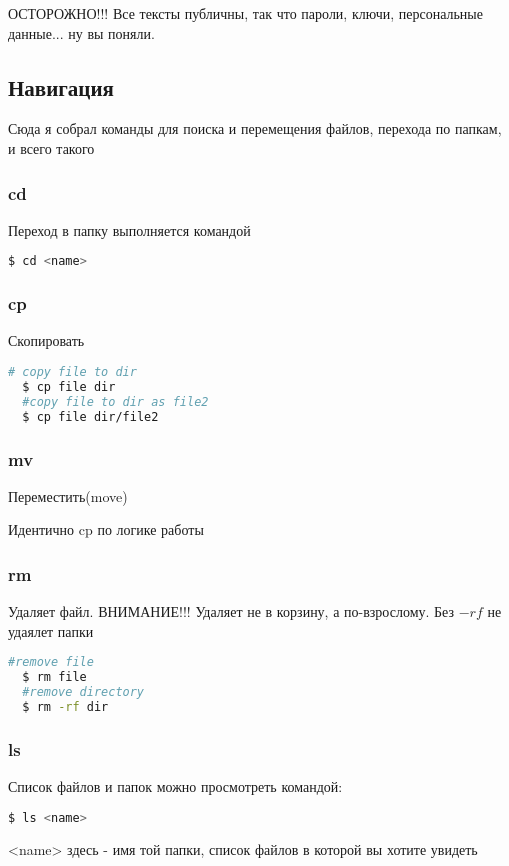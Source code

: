 \documentclass[11pt]{article}
\begin{document}
ОСТОРОЖНО!!! Все тексты публичны, так что пароли, ключи, персональные данные... ну вы поняли.


\subsection*{Навигация}
Сюда я собрал команды для поиска и перемещения файлов, перехода по папкам, и всего такого
\subsubsection*{cd}
Переход в папку выполняется командой 
\begin{lstlisting}[language=bash]
  $ cd <name>
\end{lstlisting}

\subsubsection*{cp}
Скопировать 
\begin{lstlisting}[language=bash]
  # copy file to dir
  $ cp file dir
  #copy file to dir as file2
  $ cp file dir/file2
\end{lstlisting}

\subsubsection*{mv}
Переместить(move)

Идентично cp по логике работы

\subsubsection*{rm}
Удаляет файл. ВНИМАНИЕ!!! Удаляет не в корзину, а по-взрослому. Без $-rf$ не удаялет папки
\begin{lstlisting}[language=bash]
  #remove file
  $ rm file
  #remove directory
  $ rm -rf dir
\end{lstlisting}

\subsubsection*{ls}
Список файлов и папок можно просмотреть командой:
\begin{lstlisting}[language=bash]
  $ ls <name>
\end{lstlisting}
<name> здесь - имя той папки, список файлов в которой вы хотите увидеть
\end{document}
